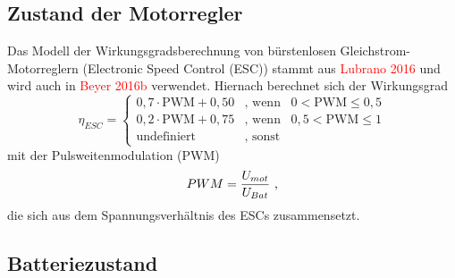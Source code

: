 \subsection{Zustand der Motorregler}
\label{subsec:motorreglerzustand}
Das Modell der Wirkungsgradsberechnung von bürstenlosen Gleichstrom-Motorreglern (Electronic Speed Control (ESC)) stammt aus \textcolor{red}{Lubrano 2016} und wird auch in \textcolor{red}{Beyer 2016b} verwendet. Hiernach berechnet sich der Wirkungsgrad 
\begin{equation}
\eta_{ESC} = \begin{cases} 
0,7\cdot \text{PWM} + 0,50 & \text{, wenn} \;\;\; 0 < \text{PWM} \leq 0,5 \\ 
0,2\cdot \text{PWM} + 0,75 & \text{, wenn} \;\;\; 0,5 < \text{PWM} \leq 1 \\ 
\text{undefiniert} & \text{, sonst} 
\end{cases}
\label{eq:eta_pwm}
\end{equation} 
mit der Pulsweitenmodulation (PWM) 
\begin{equation}
	PWM = \frac{U_{mot}}{U_{Bat}} ~\text{,}
	\label{eq:pwm}
\end{equation}
die sich aus dem Spannungsverhältnis des ESCs zusammensetzt.


\subsection{Batteriezustand}
\label{subsec:batteriezustand}

